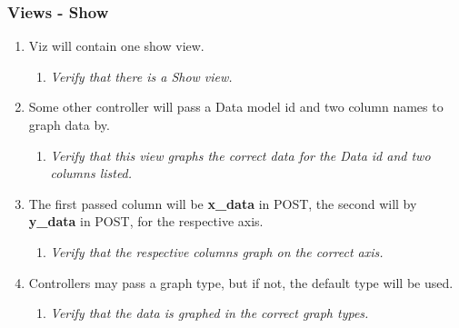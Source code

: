 \subsubsection{Views - Show}
	\begin{enumerate}
		\item Viz will contain one show view. 
		\begin{enumerate}
			\item \textit{Verify that there is a Show view.}
		\end{enumerate}

		\item Some other controller will pass a Data model id and 
			two column names to graph data by.
		\begin{enumerate}
			\item \textit{Verify that this view graphs the 
				correct data for the Data id and two 
				columns listed.}
		\end{enumerate}

		\item The first passed column will be \textbf{x\_data} 
			in POST, the second will by \textbf{y\_data} in 
			POST, for the respective axis.
		\begin{enumerate}
			\item \textit{Verify that the respective columns 
				graph on the correct axis.}
		\end{enumerate}

		\item Controllers may pass a graph type, but if not,
			the default type will be used.
		\begin{enumerate}
			\item \textit{Verify that the 
				data is graphed in the correct graph types.}
		\end{enumerate}

	\end{enumerate}

